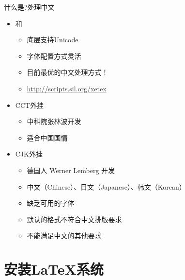 \documentclass[xcolor=svgnames, t, aspectratio=169]{ctexbeamer}
\begin{document}
\begin{frame}[t]{什么是\latex?}{处理中文}
  \stretchon
  \begin{itemize}
  \item \alert{\XeTeX}和\alert{\XeLaTeX}
    \begin{itemize}
    \item 底层支持\alert{Unicode}
    \item 字体配置方式灵活
    \item \alert{目前最优的中文处理方式！}
    \item \url{http://scripts.sil.org/xetex}
    \end{itemize}
  \item CCT\alert{外挂}
    \begin{itemize}
    \item 中科院张林波开发
    \item 适合中国国情
    \end{itemize}  
  \item CJK\alert{外挂}
    \begin{itemize}
    \item 德国人 Werner Lemberg 开发
    \item 中文（\alert{C}hinese）、日文（\alert{J}apanese）、韩文（\alert{K}orean）
    \item 缺乏可用的字体
    \item 默认的格式不符合中文排版要求
    \item 不能满足中文的其他要求
    \end{itemize}  
  \end{itemize}
  \stretchoff
\end{frame}

\section[安装\LaTeX ]{安装\LaTeX 系统}\label{sec01-04}
\end{document}
